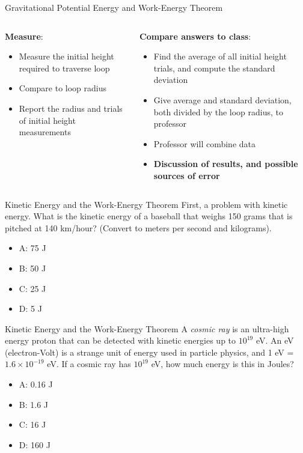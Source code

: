 \documentclass{beamer}
\begin{document}
\begin{frame}{Gravitational Potential Energy and Work-Energy Theorem}
\small
\begin{columns}[T]
\begin{column}{0.5\textwidth}
\textbf{Measure}:
\begin{itemize}
\item Measure the initial height required to traverse loop
\item Compare to loop radius
\item Report the radius and trials of initial height measurements
\end{itemize}
\end{column}
\begin{column}{0.5\textwidth}
\textbf{Compare answers to class}:
\begin{itemize}
\item Find the average of all initial height trials, and compute the standard deviation
\item Give average and standard deviation, both divided by the loop radius, to professor
\item Professor will combine data
\item \textbf{Discussion of results, and possible sources of error}
\end{itemize}
\end{column}
\end{columns}
\end{frame}

\begin{frame}{Kinetic Energy and the Work-Energy Theorem}
First, a problem with kinetic energy.  What is the kinetic energy of a baseball that weighs 150 grams that is pitched at 140 km/hour?  (Convert to meters per second and kilograms).
\begin{itemize}
\item A: 75 J
\item B: 50 J
\item C: 25 J
\item D: 5 J
\end{itemize}
\end{frame}

\begin{frame}{Kinetic Energy and the Work-Energy Theorem}
A \textit{cosmic ray} is an ultra-high energy proton that can be detected with kinetic energies up to $10^{19}$ eV.  An eV (electron-Volt) is a strange unit of energy used in particle physics, and 1 eV = $1.6 \times 10^{-19}$ eV.  If a cosmic ray has $10^{19}$ eV, how much energy is this in Joules?
\begin{itemize}
\item A: 0.16 J
\item B: 1.6 J
\item C: 16 J
\item D: 160 J
\end{itemize}
\end{frame}
\end{document}

